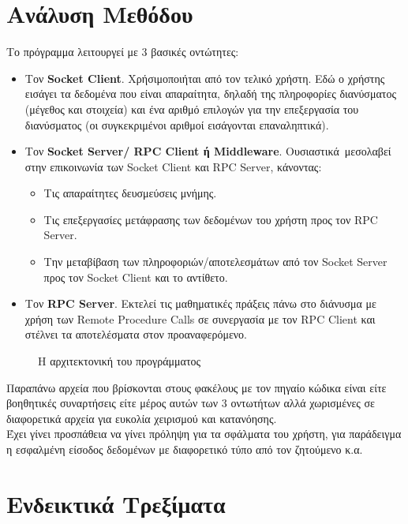 \section{Ανάλυση Μεθόδου}
Το πρόγραμμα λειτουργεί με 3 βασικές οντώτητες:
\begin{itemize}
    \item Τον \textbf{Socket Client}. Χρήσιμοποιήται από τον τελικό
        χρήστη. Εδώ ο χρήστης εισάγει τα δεδομένα που είναι απαραίτητα, δηλαδή
        της πληροφορίες διανύσματος (μέγεθος και στοιχεία) και ένα αριθμό
        επιλογών για την επεξεργασία του διανύσματος (οι συγκεκριμένοι αριθμοί
        εισάγονται επαναληπτικά).
    \item Τον \textbf{Socket Server/ RPC Client ή Middleware}. Ουσιαστικά\
        μεσολαβεί στην επικοινωνία των Socket Client και RPC Server, κάνοντας:
\begin{itemize}
        \item Τις απαραίτητες δευσμεύσεις μνήμης.
        \item Τις επεξεργασίες μετάφρασης των δεδομένων του χρήστη προς τον
            RPC Server.
        \item Την μεταβίβαση των πληροφοριών/αποτελεσμάτων από τον Socket
            Server προς τον Socket Client και το αντίθετο.
\end{itemize}
    \item Τον \textbf{RPC Server}. Εκτελεί τις μαθηματικές πράξεις πάνω στο
        διάνυσμα με χρήση των Remote Procedure Calls σε συνεργασία με τον
        RPC Client και στέλνει τα αποτελέσματα στον προαναφερόμενο.
\end{itemize}
\begin{figure}[ht]
    \centering
    \caption{\footnotesize{Η αρχιτεκτονική του προγράμματος}}
    \label{fig:searx-oper}
\end{figure}
Παραπάνω αρχεία που βρίσκονται στους φακέλους με τον πηγαίο κώδικα είναι
είτε βοηθητικές συναρτήσεις είτε μέρος αυτών των 3 οντωτήτων αλλά χωρισμένες
σε διαφορετικά αρχεία για ευκολία χειρισμού και κατανόησης.
\\
Έχει γίνει προσπάθεια να γίνει πρόληψη για τα σφάλματα του χρήστη, για
παράδειγμα η εσφαλμένη είσοδος δεδομένων με διαφορετικό τύπο από τον ζητούμενο
κ.α.
\section{Ενδεικτικά Τρεξίματα}
